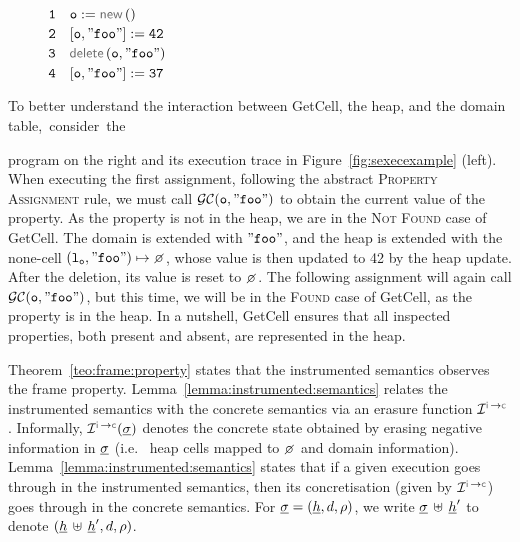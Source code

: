 \begin{figure}
\vspace*{+0.05cm}
{\small
\hspace*{-0.5cm} $\mathtt{1\quad o := \jsilnew ()}$ \\[-0.06cm]
\hspace*{-0.5cm} $\mathtt{2\quad [o, "foo"] := 42}$ \\[-0.06cm]
\hspace*{-0.5cm} $\mathtt{3\quad \jsildelete(o, "foo")}$ \\ [-0.06cm]
\hspace*{-0.5cm} $\mathtt{4\quad [o, "foo"] := 37}$ 
}
\vspace*{-0.25cm}
\end{figure}

To better understand the interaction between GetCell, the heap, and the domain table,~consider~the 

\noindent program on the right and its execution trace in Figure~\ref{fig:sexecexample} (left). When executing the first assignment, following the abstract \textsc{Property Assignment} rule, we must call $\mathcal{GC}(\mathtt{o, "foo"})$ to obtain the current value of the property. As the property is not in the heap, we are in the \textsc{Not Found} case of GetCell. The domain is extended with $\mathtt{"foo"}$, and the heap is extended with the none-cell $\mathtt{(\loc_o, "foo")} \mapsto \none$, whose value is then updated to 42 by the heap update. After the deletion, its value is reset to $\none$. The following assignment will again call $\mathcal{GC}(\mathtt{o, "foo"})$, but this time, we will be in the \textsc{Found} case of GetCell, as the property is in the heap.
In a nutshell, GetCell ensures that all inspected properties, both present and absent, are represented in the heap.




Theorem~\ref{teo:frame:property} states that the \jsil instrumented semantics observes the 
frame property. Lemma~\ref{lemma:instrumented:semantics} relates the instrumented 
semantics with the concrete semantics via an erasure function  $\interpret{\instconc}{}$. Informally, $\interpret{\instconc}{}(\istate)$
denotes the concrete state obtained by erasing negative information in $\underline{\sigma}$ (i.e.~  
heap cells mapped to $\none$ and domain information). 
Lemma~\ref{lemma:instrumented:semantics} states that if a given execution 
goes through in the instrumented semantics, then its concretisation (given by $\interpret{\instconc}{}$) 
goes through in the concrete semantics. %
For $\underline{\sigma} = (\underline{h}, d, \rho)$, we write $\underline{\sigma} \, \uplus \, \underline{h}'$ to denote $(\underline{h} \, \uplus \, \underline{h}', d, \rho)$.

